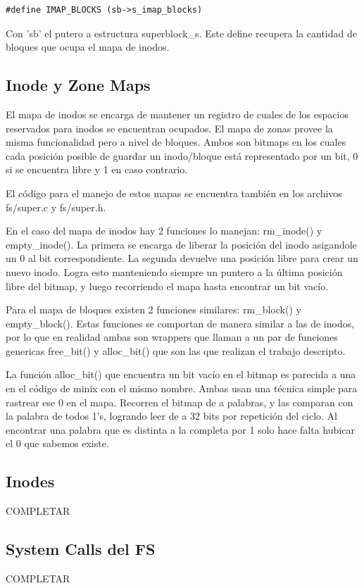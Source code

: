 \begin{verbatim}
#define IMAP_BLOCKS (sb->s_imap_blocks)
\end{verbatim}

Con 'sb' el putero a estructura superblock\_s. Este define recupera la cantidad
de bloques que ocupa el mapa de inodos.

\subsection{Inode y Zone Maps}

El mapa de inodos se encarga de mantener un registro de cuales de los espacios
reservados para inodos se encuentran ocupados. El mapa de zonas provee la misma
funcionalidad pero a nivel de bloques. Ambos son bitmaps en los cuales cada
posición posible de guardar un inodo/bloque está representado por un bit, 0 si
se encuentra libre y 1 en caso contrario.

El código para el manejo de estos mapas se encuentra también en los archivos
fs/super.c y fs/super.h.

En el caso del mapa de inodos hay 2 funciones lo manejan: rm\_inode() y
empty\_inode(). La primera se encarga de liberar la posición del inodo
asigandole un 0 al bit correspondiente. La segunda devuelve una posición libre
para crear un nuevo inodo. Logra esto manteniendo siempre un puntero a la última
posición libre del bitmap, y luego recorriendo el mapa hasta encontrar un bit
vacío.

Para el mapa de bloques existen 2 funciones similares: rm\_block() y
empty\_block(). Estas funciones se comportan de manera similar a las de inodos,
por lo que en realidad ambas son wrappers que llaman a un par de funciones
genericas free\_bit() y alloc\_bit() que son las que realizan el trabajo
descripto.

La función alloc\_bit() que encuentra un bit vacío en el bitmap es parecida a
una en el código de minix con el mismo nombre. Ambas usan una técnica simple
para rastrear ese 0 en el mapa. Recorren el bitmap de a palabras, y las comparan
con la palabra de todos 1's, logrando leer de a 32 bits por repetición del
ciclo. Al encontrar una palabra que es distinta a la completa por 1 solo hace
falta hubicar el 0 que sabemos existe.

\subsection{Inodes}

COMPLETAR

\subsection{System Calls del FS}

COMPLETAR
